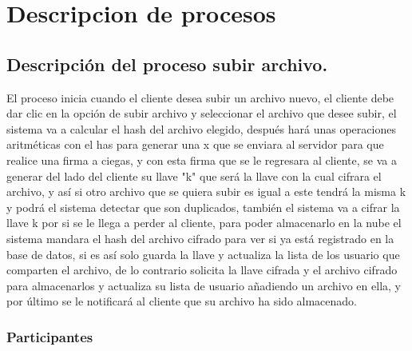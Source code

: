 

\section{Descripcion de procesos}

\subsection{Descripción del proceso subir archivo.}

El proceso inicia cuando el cliente desea subir un archivo nuevo, el cliente debe dar clic en la opción de subir archivo y seleccionar el archivo que desee subir, el sistema va a calcular el hash del archivo elegido, después hará unas operaciones aritméticas con el has para generar una x que se enviara al servidor para que realice una firma a ciegas, y con esta firma que se le regresara al cliente, se va a generar del lado del cliente su llave "k" que será la llave con la cual cifrara el archivo, y así si otro archivo que se quiera subir es igual a este tendrá la misma k y podrá el sistema detectar que son duplicados, también el sistema va a cifrar la llave k por si se le llega a perder al cliente, para poder almacenarlo en la nube el sistema mandara el hash del archivo cifrado para ver si ya está registrado en la base de datos, si es así solo guarda la llave y actualiza la lista de los usuario que comparten el archivo, de lo contrario solicita la llave cifrada y el archivo cifrado para almacenarlos y actualiza su lista de usuario añadiendo un archivo en ella, y por último se le notificará al cliente que su archivo ha sido almacenado.



\subsubsection{Participantes}

